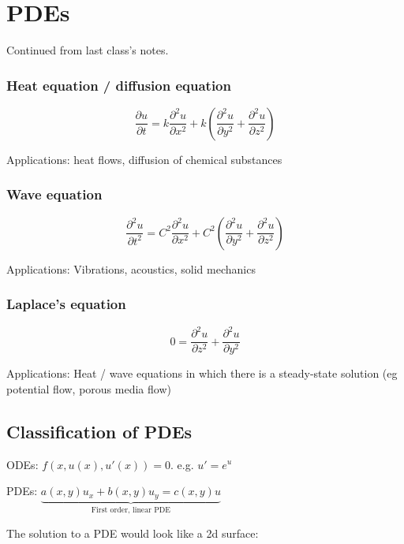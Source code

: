 \hfill

\section{PDEs}

Continued from last class's notes. 

\subsubsection{Heat equation / diffusion equation}

$$\frac{\partial u}{\partial t} = k \frac{\partial^2 u}{\partial x^2} + k \left(\frac{\partial^2 u}{\partial y^2} + \frac{\partial^2 u}{\partial z^2} \right)$$

Applications: heat flows, diffusion of chemical substances

\subsubsection{Wave equation}

$$\frac{\partial^2 u}{\partial t^2} = C^2 \frac{\partial^2 u}{\partial x^2} + C^2 \left(\frac{\partial^2 u}{\partial y^2} + \frac{\partial^2 u}{\partial z^2}\right)$$

Applications: Vibrations, acoustics, solid mechanics

\subsubsection{Laplace's equation}

$$0 = \frac{\partial^2 u}{\partial z^2} + \frac{\partial^2 u}{\partial y^2}$$

Applications: Heat / wave equations in which there is a steady-state solution (eg potential flow, porous media flow)

\subsection{Classification of PDEs}

\hfill

ODEs: $f(x,u(x), u'(x)) = 0$. e.g. $u' = e^u$

\hfill

PDEs: $\underbrace{a(x,y) u_x + b(x,y) u_y = c(x,y) u}_{\text{First order, linear PDE}}$

\hfill

The solution to a PDE would look like a 2d surface: 

